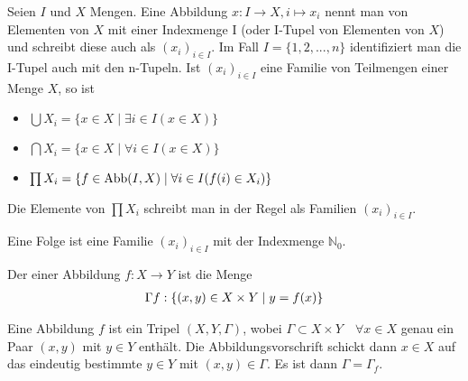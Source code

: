 \begin{definition}[Familie]
	Seien $I$ und $X$ Mengen. Eine Abbildung $x: I \to X, i \mapsto
	x_i$ nennt man  von Elementen von $X$ mit einer Indexmenge I (oder I-Tupel von 
	Elementen von $X$) und schreibt diese auch als $(x_i)_{i \in I}$. Im Fall $I=\{1,2,...,n\}$
	identifiziert man die I-Tupel auch mit den n-Tupeln. Ist $(x_i)_{i \in I}$ eine Familie von
	Teilmengen einer Menge $X$, so ist 
	\begin{itemize}
		\item $\bigcup X_i = \{x \in X \mid \exists i \in I(x \in X)\}$
		\item $\bigcap X_i = \{x \in X \mid \forall i \in I(x \in X)\}$
		\item $\prod X_i = \{f \in \operatorname{Abb}(I,X) \mid \forall i \in I(f(i) \in X_i)\}$
	\end{itemize}
	Die Elemente von $\prod X_i$ schreibt man in der Regel als Familien $(x_i)_{i \in I}$.
\end{definition}

\begin{example}
	Eine Folge ist eine Familie $(x_i)_{i \in I}$ mit der Indexmenge $\mathbb{N}_0$.
\end{example}

\begin{definition}[Graph]
	Der  einer Abbildung $f: X \to Y$ ist die Menge
	\begin{align}
		\Gamma f: \{(x,y) \in X \times Y \mid y=f(x)\}\notag
	\end{align}
\end{definition}

\begin{remark}
	Eine Abbildung $f$ ist ein Tripel $(X,Y,\Gamma)$, wobei $\Gamma \subset X \times Y \quad \forall
	x \in X$ genau ein Paar $(x,y)$ mit $y \in Y$ enthält. Die Abbildungsvorschrift schickt dann
	$x \in X$ auf das eindeutig bestimmte $y \in Y$ mit $(x,y) \in \Gamma$. Es ist dann $\Gamma =
	\Gamma_f$.
\end{remark}
